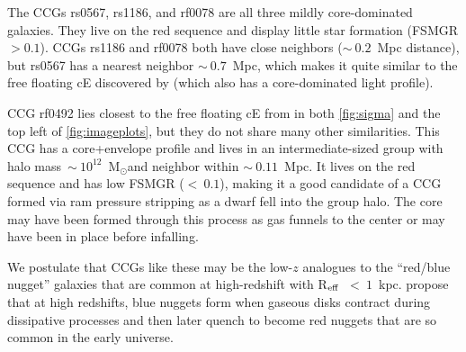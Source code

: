 \documentclass[iop,apj]{emulateapj}
\newcommand{\Reff}{R$_{\rm eff}$}
\newcommand{\Msun}{M$_{\odot}$}
\begin{document}
The CCGs rs0567, rs1186, and rf0078 are all three mildly core-dominated galaxies. They live on the red sequence and display little star formation (FSMGR $> 0.1$). CCGs rs1186 and rf0078 both have close neighbors ($\sim~0.2$~Mpc distance), but rs0567 has a nearest neighbor $\sim~0.7$~Mpc, which makes it quite similar to the free floating cE discovered by \citet{Huxor2013} (which also has a core-dominated light profile).

CCG rf0492 lies closest to the free floating cE from \citet{Huxor2013} in both \autoref{fig:sigma} and the top left of \autoref{fig:imageplots}, but they do not share many other similarities. This CCG has a core+envelope profile and lives in an intermediate-sized group with halo mass~$\sim~10^{12}$~\Msun and neighbor within $\sim~0.11$~Mpc. It lives on the red sequence and has low FSMGR ($<~0.1$), making it a good candidate of a CCG formed via ram pressure stripping as a dwarf fell into the group halo. The core may have been formed through this process as gas funnels to the center or may have been in place before infalling.

We postulate that CCGs like these may be the low-$z$ analogues to the ``red/blue nugget'' galaxies that are common at high-redshift with \Reff~$<~1$~kpc. \citet{Dekel2013} propose that at high redshifts, blue nuggets form when gaseous disks contract during dissipative processes and then later quench to become red nuggets that are so common in the early universe.
\end{document}
